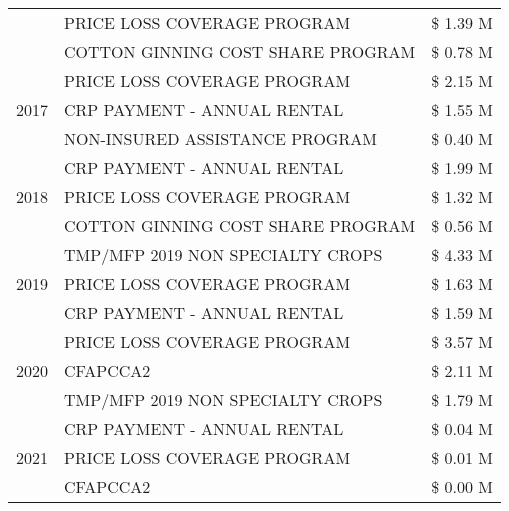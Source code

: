 \begin{tabular}{llr}
 & PRICE LOSS COVERAGE PROGRAM & \$ 1.39 M \\
 & COTTON GINNING COST SHARE PROGRAM & \$ 0.78 M \\
\cline{1-3}
\multirow[t]{3}{*}{2017} & PRICE LOSS COVERAGE PROGRAM & \$ 2.15 M \\
 & CRP PAYMENT - ANNUAL RENTAL & \$ 1.55 M \\
 & NON-INSURED ASSISTANCE PROGRAM & \$ 0.40 M \\
\cline{1-3}
\multirow[t]{3}{*}{2018} & CRP PAYMENT - ANNUAL RENTAL & \$ 1.99 M \\
 & PRICE LOSS COVERAGE PROGRAM & \$ 1.32 M \\
 & COTTON GINNING COST SHARE PROGRAM & \$ 0.56 M \\
\cline{1-3}
\multirow[t]{3}{*}{2019} & TMP/MFP 2019 NON SPECIALTY CROPS & \$ 4.33 M \\
 & PRICE LOSS COVERAGE PROGRAM & \$ 1.63 M \\
 & CRP PAYMENT - ANNUAL RENTAL & \$ 1.59 M \\
\cline{1-3}
\multirow[t]{3}{*}{2020} & PRICE LOSS COVERAGE PROGRAM & \$ 3.57 M \\
 & CFAPCCA2 & \$ 2.11 M \\
 & TMP/MFP 2019 NON SPECIALTY CROPS & \$ 1.79 M \\
\cline{1-3}
\multirow[t]{3}{*}{2021} & CRP PAYMENT - ANNUAL RENTAL & \$ 0.04 M \\
 & PRICE LOSS COVERAGE PROGRAM & \$ 0.01 M \\
 & CFAPCCA2 & \$ 0.00 M \\
\cline{1-3}
\bottomrule
\end{tabular}

